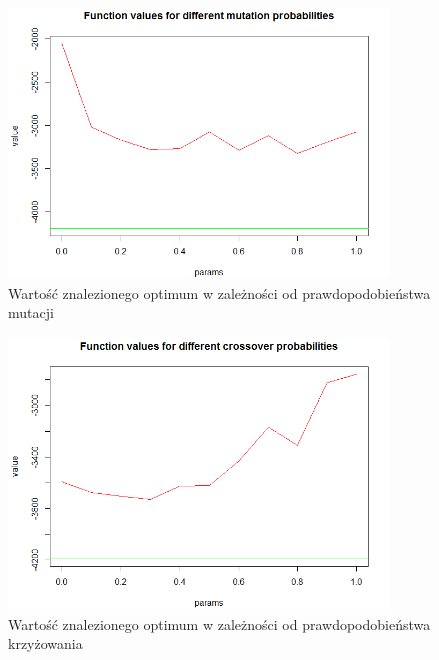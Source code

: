 \documentclass[11pt, a4paper]{article}
\begin{document}
\begin{figure}[H]
	\begin{center}
		\includegraphics[width=0.9\textwidth]{./assets/Schwefel2.png} %
		\caption{Wartość znalezionego optimum w zależności od prawdopodobieństwa mutacji}
		\label{fig:schwefel2}
	\end{center}
\end{figure}

\begin{figure}[H]
	\begin{center}
		\includegraphics[width=0.9\textwidth]{./assets/Schwefel3.png} %
		\caption{Wartość znalezionego optimum w zależności od prawdopodobieństwa krzyżowania}
		\label{fig:schwefel3}
	\end{center}
\end{figure}
\end{document}
